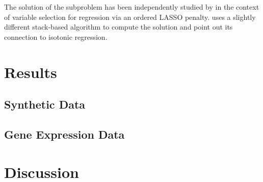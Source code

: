 \documentclass{uwstat572}
\theoremstyle{remark}
\theoremstyle{definition}
\begin{document}
The solution of the subproblem has been independently studied by \cite{su2016} in the context of variable selection for regression via an ordered LASSO penalty.  \cite{su2016} uses a slightly different stack-based algorithm to compute the solution and point out its connection to isotonic regression.


\section{Results}

\subsection{Synthetic Data}


\subsection{Gene Expression Data}

\section{Discussion}




\end{document}

